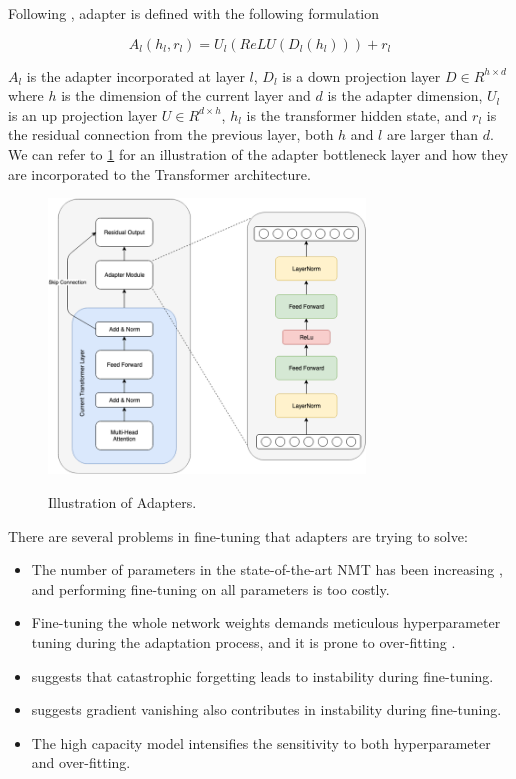 Following , adapter is defined with the following formulation

$$A_l(h_l, r_l) = U_l(ReLU(D_l(h_l))) + r_l $$

$A_l$ is the adapter incorporated at layer $l$, $D_l$ is a down projection layer $D \in R^{h \times d}$ where $h$ is the dimension of the current layer and $d$ is the adapter dimension, $U_l$ is an up projection layer $U \in R^{d \times h}$, $h_l$ is the transformer hidden state, and $r_l$ is the residual connection from the previous layer, both $h$ and $l$ are larger than $d$. We can refer to \cref{img:adapters} for an illustration of the adapter bottleneck layer and how they are incorporated to the Transformer architecture.

\begin{figure}[h]
    {\includegraphics[width=0.75\textwidth]{img/adapter_module.png}}
    \centering
    \caption{Illustration of Adapters.}
    \label{img:adapters}
\end{figure}

There are several problems in fine-tuning that adapters are trying to solve:
\begin{itemize}
    \item The number of parameters in the state-of-the-art NMT has been increasing , and performing fine-tuning on all parameters is too costly.
    \item Fine-tuning the whole network weights demands meticulous hyperparameter tuning during the adaptation process, and it is prone to over-fitting .
    \item {} suggests that catastrophic forgetting leads to instability during fine-tuning.
    \item {} suggests gradient vanishing also contributes in instability during fine-tuning.
    \item The high capacity model intensifies the sensitivity to both hyperparameter and over-fitting.
\end{itemize}

